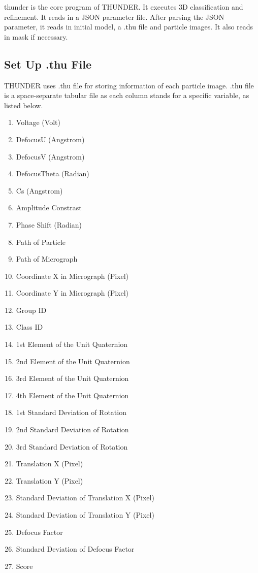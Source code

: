 \documentclass{article}
\begin{document}
        \textsf{thunder} is the core program of THUNDER. It executes 3D classification and refinement. It reads in a JSON parameter file. After parsing the JSON parameter, it reads in initial model, a \textsf{.thu} file and particle images. It also reads in mask if necessary.
              
        \subsection{Set Up \textsf{.thu} File}
        
            THUNDER uses \textsf{.thu} file for storing information of each particle image. \textsf{.thu} file is a space-separate tabular file as each column stands for a specific variable, as listed below.
            
            \begin{enumerate}
                \item Voltage (Volt)
                \item DefocusU (Angstrom)
                \item DefocusV (Angstrom)
                \item DefocusTheta (Radian)
                \item Cs (Angstrom)
                \item Amplitude Constrast
                \item Phase Shift (Radian)
                \item Path of Particle
                \item Path of Micrograph
                \item Coordinate X in Micrograph (Pixel)
                \item Coordinate Y in Micrograph (Pixel)
                \item Group ID
                \item Class ID
                \item 1st Element of the Unit Quaternion
                \item 2nd Element of the Unit Quaternion
                \item 3rd Element of the Unit Quaternion
                \item 4th Element of the Unit Quaternion
                \item 1st Standard Deviation of Rotation
                \item 2nd Standard Deviation of Rotation
                \item 3rd Standard Deviation of Rotation
                \item Translation X (Pixel)
                \item Translation Y (Pixel)
                \item Standard Deviation of Translation X (Pixel)
                \item Standard Deviation of Translation Y (Pixel)
                \item Defocus Factor
                \item Standard Deviation of Defocus Factor
                \item Score
            \end{enumerate}
\end{document}
